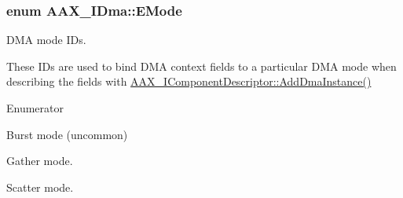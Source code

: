 \subsubsection[{E\+Mode}]{\setlength{\rightskip}{0pt plus 5cm}enum {\bf A\+A\+X\+\_\+\+I\+Dma\+::\+E\+Mode}}\label{a00095_af8d0f19f2896dd6dbd126b919b24e39b}


D\+M\+A mode I\+Ds. 

These I\+Ds are used to bind D\+M\+A context fields to a particular D\+M\+A mode when describing the fields with \hyperlink{a00088_aff9e1c726bbdf500f2d61b164589744e}{A\+A\+X\+\_\+\+I\+Component\+Descriptor\+::\+Add\+Dma\+Instance()} \begin{Desc}
\item[Enumerator]\par
\begin{description}
\item[{\em 
\hypertarget{a00095_af8d0f19f2896dd6dbd126b919b24e39ba258186a22f0d1691d0cb369c5af278a8}{}e\+Mode\+\_\+\+Error\label{a00095_af8d0f19f2896dd6dbd126b919b24e39ba258186a22f0d1691d0cb369c5af278a8}
}]\item[{\em 
\hypertarget{a00095_af8d0f19f2896dd6dbd126b919b24e39ba253c129077dc004dd83cca8931e69eb9}{}e\+Mode\+\_\+\+Burst\label{a00095_af8d0f19f2896dd6dbd126b919b24e39ba253c129077dc004dd83cca8931e69eb9}
}]Burst mode (uncommon) \item[{\em 
\hypertarget{a00095_af8d0f19f2896dd6dbd126b919b24e39badec2b76540ba9a168b7a049acb50654d}{}e\+Mode\+\_\+\+Gather\label{a00095_af8d0f19f2896dd6dbd126b919b24e39badec2b76540ba9a168b7a049acb50654d}
}]Gather mode. \item[{\em 
\hypertarget{a00095_af8d0f19f2896dd6dbd126b919b24e39bac8f3cbed92bc7d135e306cc154ac2ae6}{}e\+Mode\+\_\+\+Scatter\label{a00095_af8d0f19f2896dd6dbd126b919b24e39bac8f3cbed92bc7d135e306cc154ac2ae6}
}]Scatter mode. \end{description}
\end{Desc}


